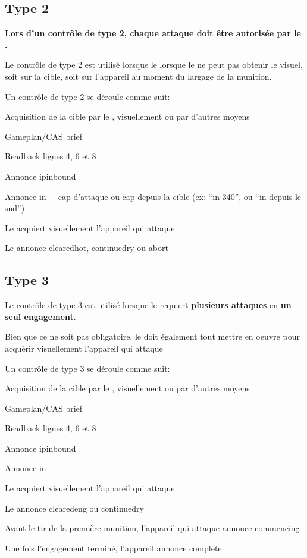 \subsection{Type 2}
\e
    \item \textbf{Lors d'un contrôle de type 2, chaque attaque doit être autorisée par le \ja{}.}
    \item Le contrôle de type 2 est utilisé lorsque le \ja{} lorsque le \ja{} ne peut pas obtenir le visuel, soit sur la cible, soit sur l'appareil au moment du largage de la munition.
    \item Un contrôle de type 2 se déroule comme suit:
    \ee
        \item Acquisition de la cible par le \ja{}, visuellement ou par d'autres moyens
        \item Gameplan/CAS brief
        \item Readback lignes 4, 6 et 8
        \item Annonce \acrshort{ipinbound}
        \item Annonce \acrshort{in} + cap d'attaque ou cap depuis la cible (ex: ``\acrshort{in} 340'', ou ``\acrshort{in} depuis le sud'')
        \item Le \ja{} acquiert visuellement l'appareil qui attaque
        \item Le \ja{} annonce \acrshort{clearedhot}, \acrshort{continuedry} ou \acrshort{abort}
    \ed
\ed

\subsection{Type 3}
\e
    \item Le contrôle de type 3 est utilisé lorsque le \ja{} requiert \textbf{plusieurs attaques} en \textbf{un seul engagement}.\vskip5mm
    \item Bien que ce ne soit pas obligatoire, le \ja{} doit également tout mettre en oeuvre pour acquérir visuellement l'appareil qui attaque
    \item Un contrôle de type 3 se déroule comme suit:
    \ee
        \item Acquisition de la cible par le \ja{}, visuellement ou par d'autres moyens
        \item Gameplan/CAS brief
        \item Readback lignes 4, 6 et 8
        \item Annonce \acrshort{ipinbound}
        \item Annonce \acrshort{in}
        \item Le \ja{} acquiert visuellement l'appareil qui attaque
        \item Le \ja{} annonce \acrshort{clearedeng} ou \acrshort{continuedry}
        \item Avant le tir de la première munition, l'appareil qui attaque annonce \acrshort{commencing}
        \item Une fois l'engagement terminé, l'appareil annonce \acrshort{complete}
    \ed
\ed

